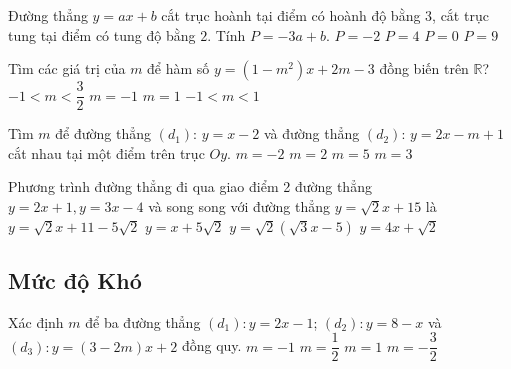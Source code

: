 \begin{ex}%
	Đường thẳng $y=ax+b$ cắt trục hoành tại điểm có hoành độ bằng 3, cắt trục tung tại điểm có tung độ bằng $2$. Tính $P=-3a+b$.
	\choice
	{$P=-2 $}
	{\True $P=4$}
	{$P=0$}
	{$P=9$}
\end{ex}

\begin{ex}%
	Tìm các giá trị của $m$ để hàm số $y=(1-m^2)x+2m-3$ đồng biến trên $\mathbb{R}$?
	\choice
	{$-1<m<\dfrac{3}{2}$}
	{$m=-1$}
	{$m=1$}
	{\True $-1<m<1$}
\end{ex}

\begin{ex}%
	Tìm $m$ để đường thẳng $(d_1):\,y=x-2$ và đường thẳng $(d_2):\,y=2x-m+1$ cắt nhau tại một điểm trên trục $Oy$.
	\choice
	{$m=-2$}
	{$m=2$}
	{$m=5$}
	{\True $m=3$}
\end{ex}

\begin{ex}%
	Phương trình đường thẳng đi qua giao điểm 2 đường thẳng $ y=2x+1, y=3x-4 $ và song song với đường thẳng $ y=\sqrt{2}x+15 $   là
	\choice
	{\True $y=\sqrt{2}x+11-5\sqrt{2} $} 
	{$y=x+5\sqrt{2} $}
	{$y=\sqrt{2}(\sqrt{3}x-5) $}
	{$y=4x+\sqrt{2} $}
\end{ex}


\subsection*{Mức độ Khó}
\begin{ex}%
	Xác định $m$ để ba đường thẳng $(d_1)\colon y=2x-1$; $(d_2)\colon y=8-x$ và $(d_3)\colon y=(3-2m)x+2$ đồng quy. 
	\choice
	{$m=-1$}
	{$m=\dfrac{1}{2}$}
	{\True $m=1$}
	{$m=-\dfrac{3}{2}$}
\end{ex}

